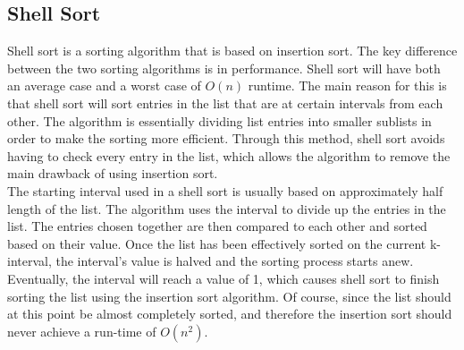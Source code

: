 \subsection{Shell Sort}
Shell sort is a sorting algorithm that is based on insertion sort. The key difference between the two sorting algorithms is in performance. Shell sort will have both an average case and a worst case of $O(n)$ runtime. The main reason for this is that shell sort will sort entries in the list that are at certain intervals from each other. The algorithm is essentially dividing list entries into smaller sublists in order to make the sorting more efficient. Through this method, shell sort avoids having to check every entry in the list, which allows the algorithm to remove the main drawback of using insertion sort.
\\[11pt]
The starting interval used in a shell sort is usually based on approximately half length of the list. The algorithm uses the interval to divide up the entries in the list. The entries chosen together are then compared to each other and sorted based on their value. Once the list has been effectively sorted on the current k-interval, the interval's value is halved and the sorting process starts anew. Eventually, the interval will reach a value of 1, which causes shell sort to finish sorting the list using the insertion sort algorithm. Of course, since the list should at this point be almost completely sorted, and therefore the insertion sort should never achieve a run-time of $O(n^2)$.